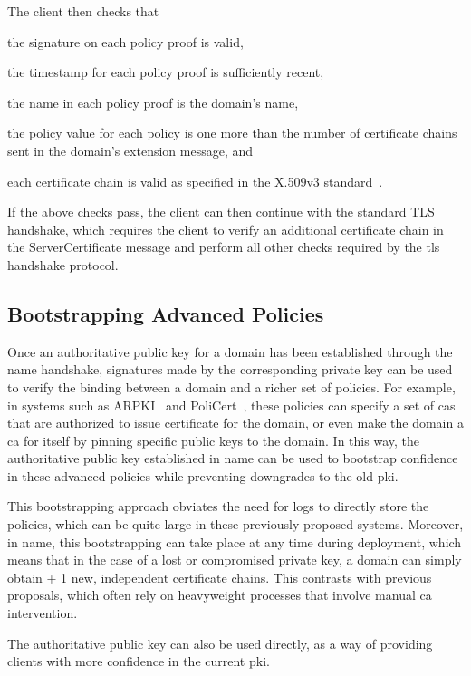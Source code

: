 The client then checks that
\begin{inparaenum}
\item the signature on each policy proof is valid,
\item the timestamp for each policy proof is sufficiently recent,
\item the name in each policy proof is the domain's name,
\item the policy value for each policy is one more than the number of
  certificate chains sent in the domain's extension message, and
\item each certificate chain is valid as specified in the X.509v3
  standard~\cite{rfc5280}.
\end{inparaenum}
If the above checks pass, the client can then continue with the standard TLS
handshake, which requires the client to verify an additional certificate chain
in the ServerCertificate message and perform all other checks required by the
\ac{tls} handshake protocol.


\subsection{Bootstrapping Advanced Policies}
\label{sec:design:bootstrapping}

Once an authoritative public key for a domain has been established through the
\ac{name} handshake, signatures made by the corresponding private key can be
used to verify the binding between a domain and a richer set of policies. For
example, in systems such as ARPKI~\cite{basin2014arpki} and
PoliCert~\cite{szalachowski2014policert}, these policies can specify a set of
\acp{ca} that are authorized to issue certificate for the domain, or even make
the domain a \ac{ca} for itself by pinning specific public keys to the domain.
In this way, the authoritative public key established in \ac{name} can be used
to bootstrap confidence in these advanced policies while preventing downgrades
to the old \ac{pki}.

This bootstrapping approach obviates the need for logs to directly store the
policies, which can be quite large in these previously proposed systems.
Moreover, in \ac{name}, this bootstrapping can take place at any time during
deployment, which means that in the case of a lost or compromised private key,
a domain can simply obtain \policy + 1 new, independent certificate chains.
This contrasts with previous proposals, which often rely on heavyweight
processes that involve manual \ac{ca} intervention.

The authoritative public key can also be used directly, as
a way of providing clients with more confidence in the current \ac{pki}.
